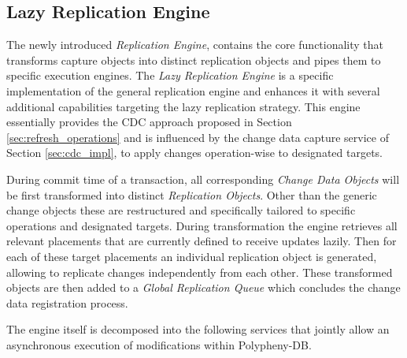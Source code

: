 
\subsection{Lazy Replication Engine}
\label{sec:lazy:_engine}

The newly introduced \emph{Replication Engine}, contains the core functionality that transforms capture objects into distinct replication objects and 
pipes them to specific execution engines.
The \emph{Lazy Replication Engine} is a specific implementation of the general replication engine and enhances it with several additional capabilities targeting
the lazy replication strategy. This engine essentially provides the CDC approach proposed in Section \ref{sec:refresh_operations} and is influenced by the 
change data capture service of Section \ref{sec:cdc_impl}, to apply changes operation-wise to designated targets.

During commit time of a transaction, all corresponding \emph{Change Data Objects} will be first transformed into distinct \emph{Replication Objects}. Other than
the generic change objects these are restructured and specifically tailored to specific operations and designated targets. During transformation the engine retrieves all 
relevant placements that are currently defined to receive updates lazily. Then for each of these target placements an individual replication object is generated, allowing to 
replicate changes independently from each other. These transformed objects are then added to a \emph{Global Replication Queue} which concludes the change data registration process.


The engine itself is decomposed into the following services that jointly allow an asynchronous execution of modifications within Polypheny-DB. 

